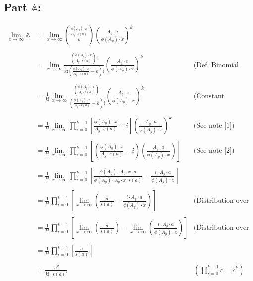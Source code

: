\documentclass[12pt]{amsart}
\theoremstyle{definition}
\numberwithin{equation}{section}
\begin{document}
   
\subsection*{Part $\mathbb{A}$:}\begin{align*}
     \lim_{x \to \infty}\mathbb{A} &= \lim_{x \to \infty}{\frac{\phi(A_y) \cdot x}{A_y \cdot s(a)} \choose k } \left(\frac{A_y \cdot a}{\phi(A_y) \cdot x}\right)^k \\\\
     &= \lim_{x \to \infty} \frac{\left(\frac{\phi(A_y) \cdot x}{A_y \cdot s(a)}\right)!}{k!\left(\frac{\phi(A_y) \cdot x}{A_y \cdot s(a)} - k \right)!} \left(\frac{A_y \cdot a}{\phi(A_y) \cdot x}\right)^k & \text{(Def. Binomial Coefficient)}\\\\
     &= \frac{1}{k!}\lim_{x \to \infty} \frac{\left(\frac{\phi(A_y) \cdot x}{A_y \cdot s(a)}\right)!}{\left(\frac{\phi(A_y) \cdot x}{A_y \cdot s(a)} - k \right)!} \left(\frac{A_y \cdot a}{\phi(A_y) \cdot x}\right)^k& \text{(Constant coefficient limit law)}\\\\
     &= \frac{1}{k!}\lim_{x \to \infty} \prod_{i = 0}^{k-1} \left[\frac{\phi(A_y) \cdot x}{A_y \cdot s(a)} - i \right ]\left(\frac{A_y \cdot a}{\phi(A_y) \cdot x}\right)^k & \text{(See note [1])}\\\\
     &= \frac{1}{k!}\lim_{x \to \infty} \prod_{i = 0}^{k-1} \left[\left(\frac{\phi(A_y) \cdot x}{A_y \cdot s(a)} - i\right)\left(\frac{A_y \cdot a}{\phi(A_y) \cdot x}\right) \right]& \text{(See note [2])}\\\\
     &= \frac{1}{k!}\lim_{x \to \infty} \prod_{i = 0}^{k-1} \left[\frac{\phi(A_y) \cdot A_y  \cdot x \cdot a}{ \phi(A_y) \cdot A_y \cdot   x \cdot s(a)} - \frac{i \cdot A_y \cdot a }{\phi(A_y) \cdot x}  \right]\\\\
     &= \frac{1}{k!} \prod_{i = 0}^{k-1} \left[\lim_{x \to \infty} \left(   \frac{a}{ s(a)} - \frac{i \cdot A_y \cdot a }{\phi(A_y) \cdot x} \right) \right]& \text{(Distribution over product limit law)}\\\\
      &= \frac{1}{k!} \prod_{i = 0}^{k-1} \left[  \lim_{x \to \infty} \left(   \frac{a}{ s(a)}\right) -  \lim_{x \to \infty}\left(\frac{i \cdot A_y \cdot a }{\phi(A_y) \cdot x} \right) \right] & \text{(Distribution over difference limit law)}\\\\
      &= \frac{1}{k!} \prod_{i = 0}^{k-1} \left[     \frac{a}{ s(a)} \right]\\\\
      &=\frac{a^k}{k! \cdot s(a)^k} & \left( \prod_{i = 0}^{k-1}c = c^k \right)
\end{align*}
\end{document}

